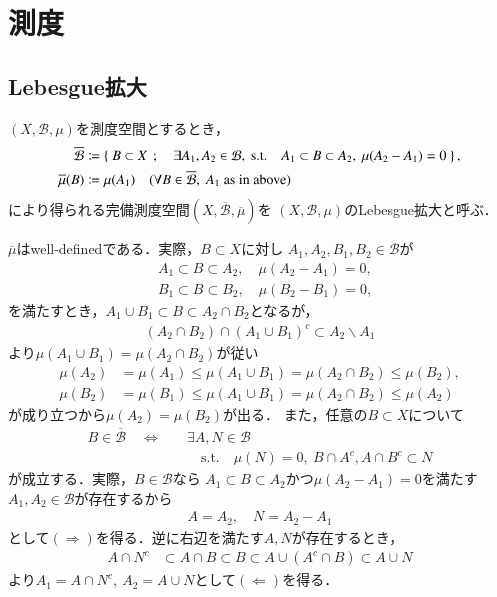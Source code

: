 \section{測度}
	\subsection{Lebesgue拡大}
		\begin{screen}
			\begin{dfn}[Lebesgue拡大]
				$(X,\mathcal{B},\mu)$を測度空間とするとき，
				\begin{align}
					\overline{\mathcal{B}} &\coloneqq
					\Set{B \subset X}{\exists A_1,A_2 \in \mathcal{B},\ \mbox{s.t.}\quad A_1 \subset B \subset A_2,\ \mu(A_2 - A_1)=0 }, \\
					\overline{\mu}(B) &\coloneqq \mu(A_1) \quad (\forall B \in \overline{\mathcal{B}},\ \mbox{$A_1$ as in above})
				\end{align}
				により得られる完備測度空間$(X,\overline{\mathcal{B}},\overline{\mu})$を
				$(X,\mathcal{B},\mu)$のLebesgue拡大と呼ぶ．
			\end{dfn}
		\end{screen}
		$\overline{\mu}$はwell-definedである．実際，$B \subset X$に対し
		$A_1,A_2,B_1,B_2 \in \mathcal{B}$が
		\begin{align}
			&A_1 \subset B \subset A_2, \quad \mu(A_2 - A_1) = 0, \\
			&B_1 \subset B \subset B_2, \quad \mu(B_2 - B_1) = 0,
		\end{align}
		を満たすとき，$A_1 \cup B_1 \subset B \subset A_2 \cap B_2$となるが，
		\begin{align}
			(A_2 \cap B_2) \cap (A_1 \cup B_1)^c
			\subset A_2 \backslash A_1
		\end{align}
		より$\mu(A_1 \cup B_1) = \mu(A_2 \cap B_2)$が従い
		\begin{align}
			\mu(A_2) &= \mu(A_1) \leq \mu(A_1 \cup B_1) = \mu(A_2 \cap B_2) \leq \mu(B_2), \\
			\mu(B_2) &= \mu(B_1) \leq \mu(A_1 \cup B_1) = \mu(A_2 \cap B_2) \leq \mu(A_2)
		\end{align}
		が成り立つから$\mu(A_2) = \mu(B_2)$が出る．
		また，任意の$B \subset X$について
		\begin{align}
			B \in \overline{\mathcal{B}}
			\quad \Leftrightarrow \quad
			&\exists A,N \in \mathcal{B} \\
			&\quad \mbox{s.t.}\quad \mu(N)=0,
			\ B \cap A^c, A \cap B^c \subset N
			\label{eq:appendix_Lebesgue_expansion_note_1}
		\end{align}
		が成立する．実際，$B \in \mathcal{B}$なら
		$A_1 \subset B \subset A_2$かつ$\mu(A_2 - A_1) = 0$を満たす$A_1,A_2 \in \mathcal{B}$が存在するから
		\begin{align}
			A = A_2, \quad N = A_2 - A_1
		\end{align}
		として$(\Rightarrow)$を得る．逆に右辺を満たす$A,N$が存在するとき，
		\begin{align}
			A \cap N^c &\subset A \cap B \subset B 
			\subset A \cup (A^c \cap B)
			\subset A \cup N
		\end{align}
		より$A_1 = A\cap N^c,\ A_2 = A \cup N$として$(\Leftarrow)$を得る．
	

